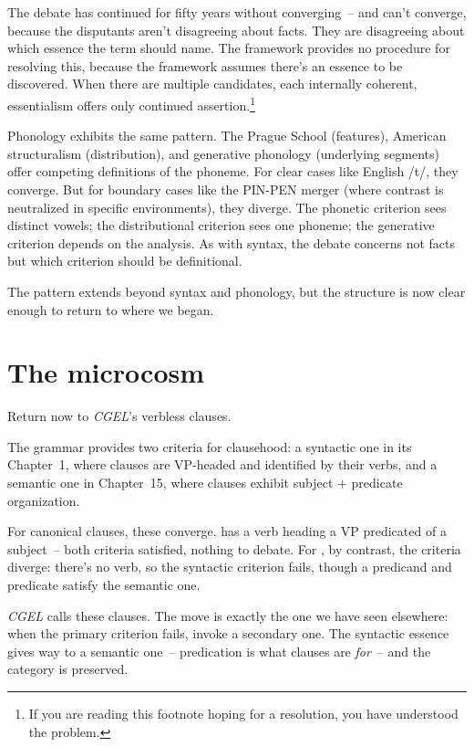 The debate has continued for fifty years without converging~-- and can't converge, because the disputants aren't disagreeing about facts. They are disagreeing about which essence the term  should name. The framework provides no procedure for resolving this, because the framework assumes there's an essence to be discovered. When there are multiple candidates, each internally coherent, essentialism offers only continued assertion.\footnote{If you are reading this footnote hoping for a resolution, you have understood the problem.}

Phonology exhibits the same pattern. The Prague School (features), American structuralism (distribution), and generative phonology (underlying segments) offer competing definitions of the phoneme. For clear cases like English /t/, they converge. But for boundary cases like the PIN-PEN merger (where contrast is neutralized in specific environments), they diverge. The phonetic criterion sees distinct vowels; the distributional criterion sees one phoneme; the generative criterion depends on the analysis. As with syntax, the debate concerns not facts but which criterion should be definitional.

The pattern extends beyond syntax and phonology, but the structure is now clear enough to return to where we began.

\section{The microcosm}
\label{sec:2:the-microcosm}

Return now to \textit{CGEL}'s verbless clauses.

The grammar provides two criteria for clausehood: a syntactic one in its Chapter~1, where clauses are VP-headed and identified by their verbs, and a semantic one in Chapter~15, where clauses exhibit subject + predicate organization.

For canonical clauses, these converge.  has a verb heading a VP predicated of a subject~-- both criteria satisfied, nothing to debate. For , by contrast, the criteria diverge: there's no verb, so the syntactic criterion fails, though a predicand and predicate satisfy the semantic one.

\textit{CGEL} calls these clauses. The move is exactly the one we have seen elsewhere: when the primary criterion fails, invoke a secondary one. The syntactic essence gives way to a semantic one~-- predication is what clauses are \emph{for}~-- and the category is preserved.

